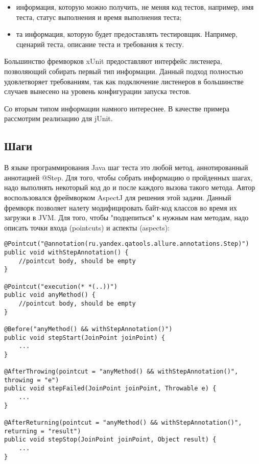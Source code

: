 \begin{itemize}
\item информация, которую можно получить, не меняя код тестов, например, имя теста, статус выполнения и время выполнения теста;
\item та информация, которую будет предоставлять тестировщик. Например, сценарий теста, описание теста и требования к тесту.
\end{itemize}

Большинство фремворков xUnit предоставляют интерфейс листенера, позволяющий собирать первый тип информации. Данный подход полностью удовлетворяет требованиям, так как подключение листенеров в большинстве случаев вынесено на уровень конфигурации запуска тестов.

Со вторым типом информации намного интереснее. В качестве примера рассмотрим реализацию для jUnit.

\subsection{Шаги}

В языке программирования Java шаг теста это любой метод, аннотированный аннотацией @Step. Для того, чтобы собрать информацию о пройденных шагах, надо выполнять некоторый код до и после каждого вызова такого метода. Автор воспользовался фреймворком AspectJ для решения этой задачи. Данный фремворк позволяет налету модифицировать байт-код классов во время их загрузки в JVM. Для того, чтобы "подцепиться" к нужным нам методам, надо описать точки входа (pointcuts) и аспекты (aspects): 

\begin{lstlisting}
@Pointcut("@annotation(ru.yandex.qatools.allure.annotations.Step)")
public void withStepAnnotation() {
    //pointcut body, should be empty
}

@Pointcut("execution(* *(..))")
public void anyMethod() {
    //pointcut body, should be empty
}

@Before("anyMethod() && withStepAnnotation()")
public void stepStart(JoinPoint joinPoint) {
    ...
}

@AfterThrowing(pointcut = "anyMethod() && withStepAnnotation()", throwing = "e")
public void stepFailed(JoinPoint joinPoint, Throwable e) {
    ...
}

@AfterReturning(pointcut = "anyMethod() && withStepAnnotation()", returning = "result")
public void stepStop(JoinPoint joinPoint, Object result) {
    ...
}
\end{lstlisting}

